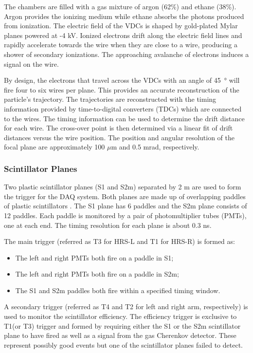 The chambers are filled with a gas mixture of argon (62\%) and ethane (38\%). Argon provides the ionizing medium while ethane absorbs the photons produced from ionization. The electric field of the VDCs is shaped by gold-plated Mylar planes powered at -4 kV. Ionized electrons drift along the electric field lines and rapidly accelerate towards the wire when they are close to a wire, producing a shower of secondary ionizations. The approaching avalanche of electrons induces a signal on the wire.

By design, the electrons that travel across the VDCs with an angle of \SI{45}{\degree} will fire four to six wires per plane. This provides an accurate reconstruction of the particle's trajectory. The trajectories are reconstructed with the timing information provided by time-to-digital converters (TDCs) which are connected to the wires. The timing information can be used to determine the drift distance for each wire. The cross-over point is then determined via a linear fit of drift distances versus the wire position. The position and angular resolution of the focal plane are approximately 100 $\mu$m and 0.5 mrad, respectively.

\subsubsection{Scintillator Planes}

Two plastic scintillator planes (S1 and S2m) separated by 2 m are used to form the trigger for the DAQ system. Both planes are made up of overlapping paddles of plastic scintillators \cite{Alcorn2004}. The S1 plane has 6 paddles and the S2m plane consists of 12 paddles. Each paddle is monitored by a pair of photomultiplier tubes (PMTs), one at each end. The timing resolution for each plane is about 0.3 ns.

The main trigger (referred as T3 for HRS-L and T1 for HRS-R) is formed as:
\begin{itemize}[parsep=0pt]
\item The left and right PMTs both fire on a paddle in S1;
\item The left and right PMTs both fire on a paddle in S2m;
\item The S1 and S2m paddles both fire within a specified timing window.
\end{itemize}
A secondary trigger (referred as T4 and T2 for left and right arm, respectively) is used to monitor the scintillator efficiency. The efficiency trigger is exclusive to T1(or T3) trigger and formed by requiring either the S1 or the S2m scintillator plane to have fired as well as a signal from the gas Cherenkov detector. These represent possibly good events but one of the scintillator planes failed to detect.


